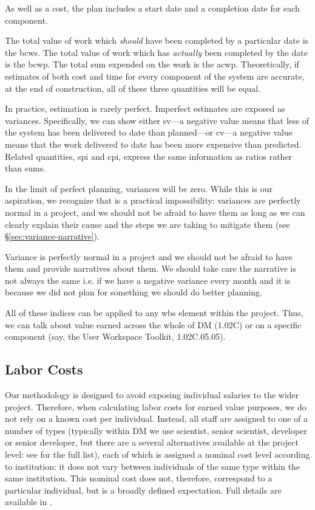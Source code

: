 As well as a cost, the plan includes a start date and a completion date
for each component.

The total value of work which \emph{should} have been completed by a particular date is the \gls{bcws}.
The total value of work which has \emph{actually} been completed by the date is the \gls{bcwp}.
The total sum expended on the work is the \gls{acwp}.
Theoretically, if estimates of both cost and time for every component of the system are accurate, at the end of construction, all of these three quantities will be equal.

In practice, estimation is rarely perfect.
Imperfect estimates are exposed as variances.
Specifically, we can show either \gls{sv}---a negative value means that less
of the system has been delivered to date than planned---or \gls{cv}---a negative value means that the work delivered to date has been more expensive than predicted.
Related quantities, \gls{spi} and \gls{cpi}, express the same information as ratios rather than sums.

In the limit of perfect planning, variances will be zero.
While this is our aspiration, we recognize that is a practical impossibility: variances are perfectly normal in a project, and we should not be afraid to have them as long as we can clearly explain their cause and the steps we are taking to mitigate them (see \S\ref{sec:variance-narrative}).

Variance is perfectly normal in a project and we should not be afraid to have them and provide narratives about them. We should take care the narrative is not always the same i.e. if we have a negative variance every month and it is because we did not plan for something we should do better planning.

All of these indices can be applied to any \gls{wbs} \gls{element} within the project.
Thus, we can talk about value earned across the whole of DM (1.02C) or on a specific component (say, the User Workspace Toolkit, 1.02C.05.05).

\subsection{Labor Costs}
\label{sec:labor-costs}

Our methodology is designed to avoid exposing individual salaries to the wider project.
Therefore, when calculating labor costs for earned value purposes, we do not rely on a known cost per individual.
Instead, all staff are assigned to one of a number of types (typically within DM we use scientist, senior scientist, developer or senior developer, but there are a several alternatives available at the project level: see  for the full list), each of which is assigned a nominal cost level according to institution: it does not vary between individuals of the same type within the same institution.
This nominal cost does not, therefore, correspond to a particular individual, but is a broadly defined expectation.
Full details are available in .

